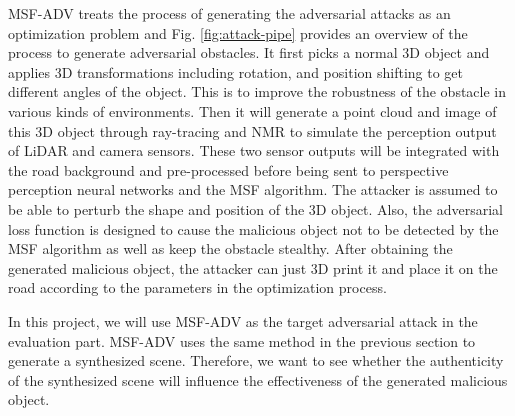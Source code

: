 MSF-ADV\cite{msf-adv} treats the process of generating the adversarial attacks as an optimization problem and Fig. \ref{fig:attack-pipe} provides an overview of the process to generate adversarial obstacles. 
It first picks a normal 3D object and applies 3D transformations including rotation, and position shifting to get different angles of the object.
This is to improve the robustness of the obstacle in various kinds of environments.
Then it will generate a point cloud and image of this 3D object through ray-tracing\cite{ray-tracing} and NMR\cite{nmr} to simulate the perception output of LiDAR and camera sensors.
These two sensor outputs will be integrated with the road background and pre-processed before being sent to perspective perception neural networks and the MSF algorithm.
The attacker is assumed to be able to perturb the shape and position of the 3D object.
Also, the adversarial loss function is designed to cause the malicious object not to be detected by the MSF algorithm as well as keep the obstacle stealthy.
After obtaining the generated malicious object, the attacker can just 3D print it and place it on the road according to the parameters in the optimization process.

In this project, we will use MSF-ADV\cite{msf-adv} as the target adversarial attack in the evaluation part.
MSF-ADV\cite{msf-adv} uses the same method in the previous section to generate a synthesized scene. 
Therefore, we want to see whether the authenticity of the synthesized scene will influence the effectiveness of the generated malicious object.



